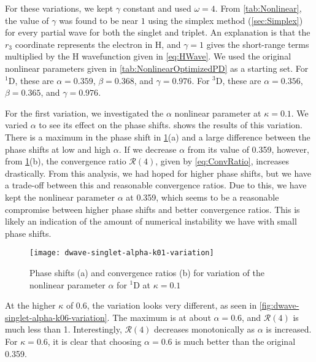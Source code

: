 \documentclass[Dissertation.tex]{subfiles}
\begin{document}
For these variations, we kept $\gamma$ constant and used $\omega = 4$. From 
\cref{tab:Nonlinear}, the value of $\gamma$ was found to be near $1$ using 
the simplex method (\cref{sec:Simplex}) for every partial wave for both the 
singlet and triplet. An explanation is that the $r_3$ coordinate represents 
the electron in H, and $\gamma = 1$ gives the short-range terms multiplied by 
the H wavefunction given in \cref{eq:HWave}. We used the original nonlinear 
parameters given in \cref{tab:NonlinearOptimizedPD} as a starting set. For
$^1$D, these are $\alpha = 0.359$, $\beta = 0.368$, and $\gamma = 0.976$. For
$^3$D, these are $\alpha = 0.356$, $\beta = 0.365$, and $\gamma = 0.976$.

For the first variation, we investigated the $\alpha$ nonlinear parameter at
$\kappa = 0.1$. We varied $\alpha$ to see its effect on the phase shifts.
 shows the results of this
variation. There is a maximum in the phase shift in 
\cref{fig:dwave-singlet-alpha-k01-variation}(a) and a large difference between
the phase shifts at low and high $\alpha$. If we decrease
$\alpha$ from its value of 0.359, however, from
\cref{fig:dwave-singlet-alpha-k01-variation}(b),
the convergence ratio $\mathcal{R}(4)$, given by \cref{eq:ConvRatio},
increases drastically. From this analysis, we had hoped for higher phase shifts,
but we have a trade-off between this and reasonable convergence ratios. Due to
this, we have kept the nonlinear parameter $\alpha$ at 0.359, which seems to be
a reasonable compromise between higher phase shifts and better convergence
ratios. This is likely an indication of the amount of numerical instability
we have with small phase shifts.


\begin{figure}
	\centering
	\texttt{[image: dwave-singlet-alpha-k01-variation]}
	\caption[Variation of the nonlinear parameter $\alpha$ for $^{1}$D at $\kappa = 0.1$]{Phase shifts (a) and convergence ratios (b) for variation of the nonlinear parameter $\alpha$ for $^{1}$D at $\kappa = 0.1$}
	\label{fig:dwave-singlet-alpha-k01-variation}
\end{figure}

At the higher $\kappa$ of 0.6, the variation looks very different, as seen in
\cref{fig:dwave-singlet-alpha-k06-variation}. The maximum is at about
$\alpha = 0.6$, and $\mathcal{R}(4)$ is much less than 1. Interestingly,
$\mathcal{R}(4)$ decreases monotonically as $\alpha$ is increased. For
$\kappa = 0.6$, it is clear that choosing $\alpha = 0.6$ is much better than
the original 0.359.
\end{document}
